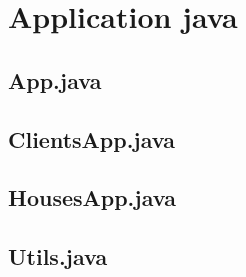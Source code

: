 \documentclass[11pt,a4paper]{report}
\begin{document}
\chapter{Application java}
\section{App.java}

\newpage

\section{ClientsApp.java}

\newpage

\section{HousesApp.java}

\newpage

\section{Utils.java}

\newpage
\end{document}
